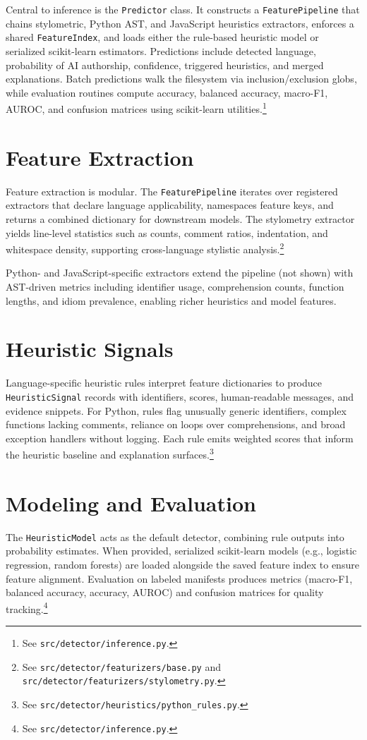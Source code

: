 \documentclass[11pt]{article}
\begin{document}
Central to inference is the \texttt{Predictor} class. It constructs a \texttt{FeaturePipeline} that chains stylometric, Python AST, and JavaScript heuristics extractors, enforces a shared \texttt{FeatureIndex}, and loads either the rule-based heuristic model or serialized scikit-learn estimators. Predictions include detected language, probability of AI authorship, confidence, triggered heuristics, and merged explanations. Batch predictions walk the filesystem via inclusion/exclusion globs, while evaluation routines compute accuracy, balanced accuracy, macro-F1, AUROC, and confusion matrices using scikit-learn utilities.\footnote{See \texttt{src/detector/inference.py}.}

\section{Feature Extraction}
\label{sec:features}
Feature extraction is modular. The \texttt{FeaturePipeline} iterates over registered extractors that declare language applicability, namespaces feature keys, and returns a combined dictionary for downstream models. The stylometry extractor yields line-level statistics such as counts, comment ratios, indentation, and whitespace density, supporting cross-language stylistic analysis.\footnote{See \texttt{src/detector/featurizers/base.py} and \texttt{src/detector/featurizers/stylometry.py}.}

Python- and JavaScript-specific extractors extend the pipeline (not shown) with AST-driven metrics including identifier usage, comprehension counts, function lengths, and idiom prevalence, enabling richer heuristics and model features.

\section{Heuristic Signals}
\label{sec:heuristics}
Language-specific heuristic rules interpret feature dictionaries to produce \texttt{HeuristicSignal} records with identifiers, scores, human-readable messages, and evidence snippets. For Python, rules flag unusually generic identifiers, complex functions lacking comments, reliance on loops over comprehensions, and broad exception handlers without logging. Each rule emits weighted scores that inform the heuristic baseline and explanation surfaces.\footnote{See \texttt{src/detector/heuristics/\allowbreak python\_rules.py}.}

\section{Modeling and Evaluation}
\label{sec:modeling}
The \texttt{HeuristicModel} acts as the default detector, combining rule outputs into probability estimates. When provided, serialized scikit-learn models (e.g., logistic regression, random forests) are loaded alongside the saved feature index to ensure feature alignment. Evaluation on labeled manifests produces metrics (macro-F1, balanced accuracy, accuracy, AUROC) and confusion matrices for quality tracking.\footnote{See \texttt{src/detector/inference.py}.}
\end{document}
